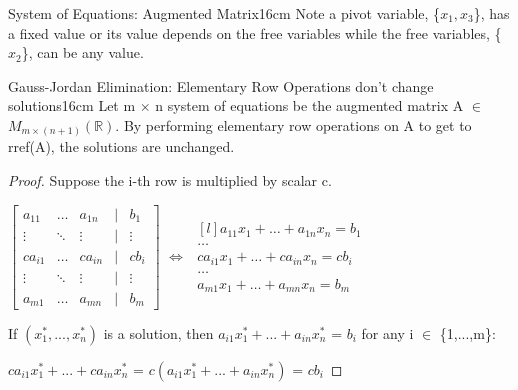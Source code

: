 \begin{definition}{System of Equations: Augmented Matrix}{16cm}
        Note a pivot variable, \{$x_1,x_3$\}, has a fixed value
        or its value depends on the free variables while the free variables,
        \{$x_2$\}, can be any value.
    \end{definition}

    \newpage



    \begin{wtheorem}{Gauss-Jordan Elimination:
    Elementary Row Operations don't change solutions}{16cm}
        Let m $\times$ n system of equations be the
        augmented matrix A $\in$ $M_{m \times (n+1)}(\mathbb{R})$.
        By performing elementary row operations on A to get to rref(A),
        the solutions are unchanged.
    \end{wtheorem}

    \begin{proof}
        Suppose the i-th row is multiplied by scalar c.

        \hspace{0.5cm}
        \footnotesize
        $\begin{bmatrix}
            a_{11} & \hdots & a_{1n} & | & b_1 \\
            \vdots & \ddots & \vdots & | & \vdots \\
            ca_{i1} & \hdots & ca_{in} & | & cb_i \\
            \vdots & \ddots & \vdots & | & \vdots \\
            a_{m1} & \hdots & a_{mn} & | & b_m
        \end{bmatrix}$
        \hspace{0.5cm}
        $\Leftrightarrow$
        \hspace{0.5cm}
        $\begin{matrix*}[l]
            a_{11}x_1 + \hdots + a_{1n}x_n = b_1 \\
            \hdots \\
            ca_{i1}x_1 + \hdots + ca_{in}x_n = cb_i \\
            \hdots \\
            a_{m1}x_1 + \hdots + a_{mn}x_n = b_m
        \end{matrix*}$
        \normalsize

        \hspace{0.5cm}
        If $(x_1^*,...,x_n^*)$ is a solution,
        then $a_{i1}x_1^* + ... + a_{in}x_n^*$ = $b_i$
        for any i $\in$ \{1,...,m\}:

        \hspace{1cm}
        $ca_{i1}x_1^* + ... + ca_{in}x_n^*$
        = $c(a_{i1}x_1^* + ... + a_{in}x_n^*)$
        = $cb_i$
        

\end{proof}

